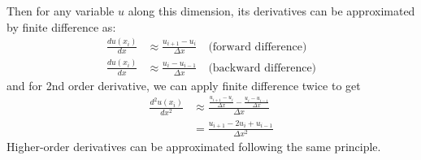 \documentclass[a4paper,11pt]{article}
\theoremstyle{definition}
\begin{document}
\noindent Then for any variable $u$ along this dimension, its derivatives can be approximated by
finite difference as:
\begin{align}
	\frac{d u(x_i)}{d x} &\approx \frac{u_{i+1} - u_i}{\Delta x}  \quad \textrm{(forward difference)} \nonumber \\
	\frac{d u(x_i)}{d x} &\approx \frac{u_i - u_{i-1}}{\Delta x}  \quad \textrm{(backward difference)} \nonumber 
\end{align}
\noindent and for 2nd order derivative, we can apply finite difference twice to get
\begin{align}
	\frac{d^2 u(x_i)}{d x^2} &\approx \frac{ \frac{u_{i+1} - u_i}{\Delta x} - \frac{u_i - u_{i-1}}{\Delta x}  }{ \Delta x} \nonumber \\
		&= \frac{u_{i+1} - 2 u_i + u_{i-1}}{\Delta x^2}  \nonumber
\end{align}
\noindent Higher-order derivatives can be approximated following the same principle.
\end{document}
